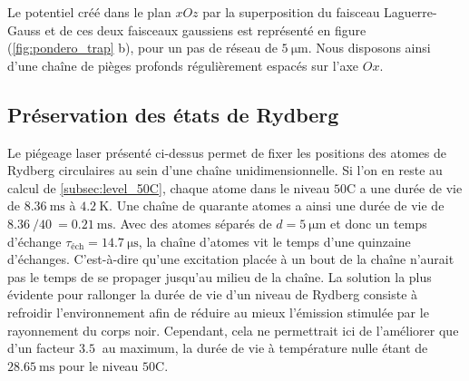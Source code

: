 Le potentiel créé dans le plan $xOz$ par la superposition du faisceau Laguerre-Gauss et de ces deux faisceaux gaussiens est représenté en figure (\ref{fig:pondero_trap} b), pour un pas de réseau de $\SI{5}{\um}$.
Nous disposons ainsi d'une chaîne de pièges profonds régulièrement espacés sur l'axe $Ox$.

	
	\subsection{Préservation des états de Rydberg}\label{subsec:inhibition}
\noindent Le piégeage laser présenté ci-dessus permet de fixer les positions des atomes de Rydberg circulaires au sein d'une chaîne unidimensionnelle.
Si l'on en reste au calcul de \ref{subsec:level_50C}, chaque atome dans le niveau $\mathrm{50C}$ a une durée de vie de $\SI{8.36}{\ms}$ à $\SI{4.2}{\K}$.
Une chaîne de quarante atomes a ainsi une durée de vie de $\SI{8.36}{}/\SI{40}{} = \SI{0.21}{\ms}$.
Avec des atomes séparés de $d=\SI{5}{\um}$ et donc un temps d'échange $\tau_{\text{éch}} = \SI{14.7}{\us}$, la chaîne d'atomes vit le temps d'une quinzaine d'échanges.
C'est-à-dire qu'une excitation placée à un bout de la chaîne n'aurait pas le temps de se propager jusqu'au milieu de la chaîne.
La solution la plus évidente pour rallonger la durée de vie d'un niveau de Rydberg consiste à refroidir l'environnement afin de réduire au mieux l'émission stimulée par le rayonnement du corps noir.
Cependant, cela ne permettrait ici de l'améliorer que d'un facteur $%
\SI{3.5}{}$ au maximum, la durée de vie à température nulle étant de $\SI{28.65}{\ms}$ pour le niveau $\mathrm{50C}$.

